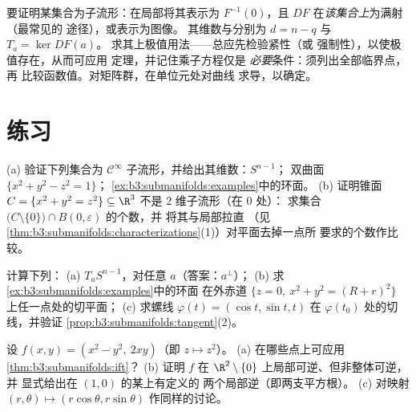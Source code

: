 \begin{method}\label{met:b3:submanifolds:method}
要证明某集合为子流形：在局部将其表示为
$F^{-1}(0)$，且 $DF$ 在\emph{该集合上}为满射（最常见的
途径），或表示为图像。
其维数与分别为 $d = n - q$ 与 $T_a = \ker DF(a)$。
求其上极值用法——总应先检验紧性（或
强制性），以使极值存在，从而可应用
定理，并记住乘子方程仅是
\emph{必要}条件：须列出全部临界点，再
比较函数值。对矩阵群，在单位元处对曲线
求导，以确定。
\end{method}

\section{练习}

\begin{exercise}[$\star$]\label{exo:b3:submanifolds:1}
(a) 验证下列集合为 $\mathcal C^\infty$
子流形，并给出其维数：$S^{n-1}$；
双曲面 $\{x^2 + y^2 - z^2 = 1\}$；
\cref{ex:b3:submanifolds:examples}中的环面。
(b) 证明锥面 $C = \{x^2 + y^2 = z^2\} \subseteq
\R^3$ 不是 $2$ 维子流形（在 $0$ 处）：
求集合
$\bigl(C\setminus\{0\}\bigr)\cap B(0,\varepsilon)$ 的个数，并
将其与局部拉直
（见\cref{thm:b3:submanifolds:characterizations}(1)）对平面去掉一点所
要求的个数作比较。
\end{exercise}

\begin{exercise}[$\star$]\label{exo:b3:submanifolds:2}
计算下列：
(a) $T_aS^{n-1}$，对任意 $a$（答案：$a^\perp$）；
(b) 求\cref{ex:b3:submanifolds:examples}中的环面
在外赤道
$\{z = 0,\ x^2 + y^2 = (R + r)^2\}$ 上任一点处的切平面；
(c) 求螺线 $\varphi(t) = (\cos t,
\sin t, t)$ 在 $\varphi(t_0)$ 处的切线，并验证
\cref{prop:b3:submanifolds:tangent}(2)。
\end{exercise}

\begin{exercise}[$\star\star$]\label{exo:b3:submanifolds:3}
设 $f(x, y) = (x^2 - y^2,\ 2xy)$（即 $z \mapsto z^2$）。
(a) 在哪些点上可应用\cref{thm:b3:submanifolds:ift}？
(b) 证明 $f$ 在
$\R^2\setminus\{0\}$ 上局部可逆、但非整体可逆，并
显式给出在 $(1, 0)$ 的某上有定义的
两个局部逆（即两支平方根）。
(c) 对映射 $(r,
\theta) \mapsto (r\cos\theta, r\sin\theta)$ 作同样的讨论。
\end{exercise}

